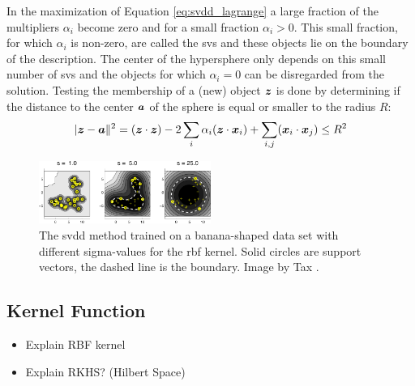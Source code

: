 In the maximization of Equation \ref{eq:svdd_lagrange} a large fraction of the multipliers $\alpha_i$ become zero and for a small fraction $\alpha_i > 0$.
This small fraction, for which $\alpha_i$ is non-zero, are called the \glspl{sv} and these objects lie on the boundary of the description.
The center of the hypersphere only depends on this small number of \glspl{sv} and the objects for which $\alpha_i = 0$ can be disregarded from the solution.
Testing the membership of a (new) object $\vectorsym{z}$ is done by determining if the distance to the center $\vectorsym{a}$ of the sphere is equal or smaller to the radius $R$:
\begin{equation}
  \lvert \vectorsym{z} - \vectorsym{a} \rVert ^2 = (\vectorsym{z} \cdot \vectorsym{z}) - 2 \sum_{i} \alpha_i(\vectorsym{z} \cdot \vectorsym{x}_i) + \sum_{i,j}(\vectorsym{x}_i \cdot \vectorsym{x}_j) \le R^2
\end{equation}


\begin{figure}
  \centering
    \includegraphics[width=0.5\textwidth,keepaspectratio]{./Figures/chapter3/svdd-boundary.pdf}
  \caption[\gls{svdd} boundary]{The \gls{svdd} method trained on a banana-shaped data set with different sigma-values for the \gls{rbf} kernel. Solid circles are support vectors, the dashed line is the boundary. Image by Tax \cite{tax2001one}.}
  \label{fig:svdd-boundary}
\end{figure}


\subsection{Kernel Function}\label{subsec:kernel_function}

\begin{itemize}
  \item Explain RBF kernel
  \item Explain RKHS? (Hilbert Space)
\end{itemize}

